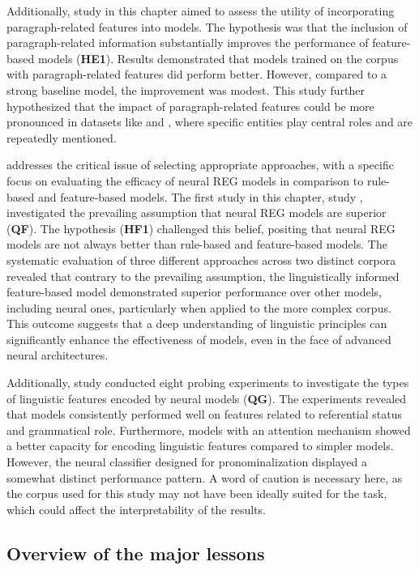 Additionally, study \studE in this chapter aimed to assess the utility of incorporating paragraph-related features into \context models. The hypothesis was that the inclusion of paragraph-related information substantially improves the performance of feature-based \context models (\textbf{HE1}). Results demonstrated that models trained on the \wsj corpus with paragraph-related features did perform better. However, compared to a strong baseline model, the improvement was modest. This study further hypothesized that the impact of paragraph-related features could be more pronounced in datasets like \grectwo and \grecp, where specific entities play central roles and are repeatedly mentioned.


  addresses the critical issue of selecting appropriate \context approaches, with a specific focus on evaluating the efficacy of neural REG models in comparison to rule-based and feature-based models. The first study in this chapter, study \studF, investigated the prevailing assumption that neural REG models are superior (\textbf{QF}). The hypothesis (\textbf{HF1}) challenged this belief, positing that neural REG models are not always better than rule-based and feature-based models. The systematic evaluation of three different \context approaches across two distinct corpora revealed that contrary to the prevailing assumption, the linguistically informed feature-based model demonstrated superior performance over other models, including neural ones, particularly when applied to the more complex \wsj corpus. This outcome suggests that a deep understanding of linguistic principles can significantly enhance the effectiveness of \context models, even in the face of advanced neural architectures.

Additionally, study \studG conducted eight probing experiments to investigate the types of linguistic features encoded by neural \context models (\textbf{QG}). The experiments revealed that models consistently performed well on features related to referential status and grammatical role. Furthermore, models with an attention mechanism showed a better capacity for encoding linguistic features compared to simpler models. However, the neural classifier designed for pronominalization displayed a somewhat distinct performance pattern. A word of caution is necessary here, as the corpus used for this study may not have been ideally suited for the task, which could affect the interpretability of the results.

\subsection{Overview of the major lessons}

